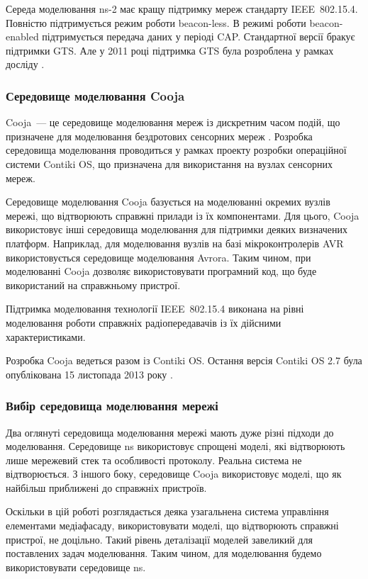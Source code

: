 \documentclass[a4paper,ukrainian,utf8,nocolumnsxix,nocolumnxxxii,nocolumnxxxi,floatsection,equationsection]{eskdtext}
\renewcommand\paragraph{\subsubsection}
\newcommand{\iee}[0]{IEEE~802.15.4\xspace}
\newcommand{\blm}[0]{beacon-less\xspace}
\newcommand{\bem}[0]{beacon-enabled\xspace}
\begin{document}
Середа моделювання ns-2 має кращу підтримку мереж стандарту \iee. Повністю підтримується режим роботи \blm. В режимі роботи \bem підтримується передача даних у періоді CAP. Стандартної версії бракує підтримки GTS. Але у 2011 році підтримка GTS була розроблена у рамках досліду \cite{ns2:with:cfp}.

\paragraph{Середовище моделювання Cooja}

Cooja~--- це середовище моделювання мереж із дискретним часом подій, що призначене для моделювання бездротових сенсорних мереж \cite{cooja:intro}. Розробка середовища моделювання проводиться у рамках проекту розробки операційної системи Contiki OS, що призначена для використання на вузлах сенсорних мереж. 

Середовище моделювання Cooja базується на моделюванні окремих вузлів мережі, що відтворюють справжні прилади із їх компонентами. Для цього, Cooja використовує інші середовища моделювання для підтримки деяких визначених платформ. Наприклад, для моделювання вузлів на базі мікроконтролерів AVR використовується середовище моделювання Avrora. Таким чином, при моделюванні Cooja дозволяє використовувати програмний код, що буде використаний на справжньому пристрої.

Підтримка моделювання технології \iee виконана на рівні моделювання роботи справжніх радіопередавачів із їх дійсними характеристиками.

Розробка Cooja ведеться разом із Contiki OS. Остання версія Contiki OS 2.7 була опублікована 15 листопада 2013 року \cite{contikios:27:released}. 

\paragraph{Вибір середовища моделювання мережі}

Два оглянуті середовища моделювання мережі мають дуже різні підходи до моделювання. Середовище ns використовує спрощені моделі, які відтворюють лише мережевий стек та особливості протоколу. Реальна система не відтворюється. З іншого боку, середовище Cooja використовує моделі, що як найбільш приближені до справжніх пристроїв. 

Оскільки в цій роботі розглядається деяка узагальнена система управління елементами медіафасаду, використовувати моделі, що відтворюють справжні пристрої, не доцільно. Такий рівень деталізації моделей завеликий для поставлених задач моделювання. Таким чином, для моделювання будемо використовувати середовище ns.
\end{document}
